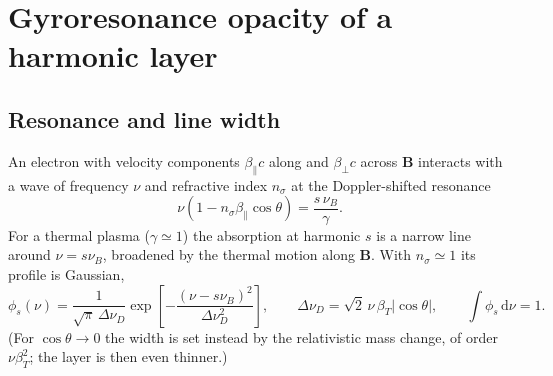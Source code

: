 \documentclass[11pt,a4paper]{article}
\newcommand{\vect}[1]{\bm{#1}}
\newcommand{\dd}{\mathrm{d}}
\newcommand{\nuB}{\nu_B}
\begin{document}
\section{Gyroresonance opacity of a harmonic layer}\label{sec:opacity}

\subsection{Resonance and line width}
An electron with velocity components $\beta_\parallel c$ along and $\beta_\perp c$ across
$\vect B$ interacts with a wave of frequency $\nu$ and refractive index $n_\sigma$ at the
Doppler-shifted resonance
\begin{equation}
  \nu\left(1-n_\sigma\beta_\parallel\cos\theta\right)=\frac{s\,\nuB}{\gamma}.
\end{equation}
For a thermal plasma ($\gamma\simeq1$) the absorption at harmonic $s$ is a narrow line around
$\nu=s\nuB$, broadened by the thermal motion along $\vect B$. With $n_\sigma\simeq1$ its profile is
Gaussian,
\begin{equation}
  \phi_s(\nu)=\frac{1}{\sqrt\pi\,\Delta\nu_D}\exp\!\left[-\frac{(\nu-s\nuB)^2}{\Delta\nu_D^2}\right],
  \qquad
  \Delta\nu_D=\sqrt2\,\nu\,\beta_T|\cos\theta|,\qquad \int\phi_s\,\dd\nu=1.
  \label{eq:profile}
\end{equation}
(For $\cos\theta\to0$ the width is set instead by the relativistic mass change, of order
$\nu\beta_T^2$; the layer is then even thinner.)
\end{document}
